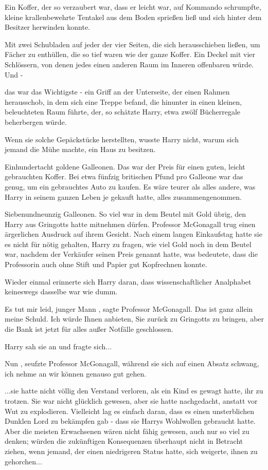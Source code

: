 Ein Koffer, der so verzaubert war, dass er leicht war, auf Kommando schrumpfte,
kleine krallenbewehrte Tentakel aus dem Boden sprießen ließ und sich hinter
dem Besitzer herwinden konnte.

Mit zwei Schubladen auf jeder der vier Seiten, die sich herausschieben ließen,
um Fächer zu enthüllen, die so tief waren wie der ganze Koffer. Ein Deckel
mit vier Schlössern, von denen jedes einen anderen Raum im Inneren
offenbaren würde. Und -

das war das Wichtigste - ein Griff an der Unterseite, der einen Rahmen
herausschob, in dem sich eine Treppe befand, die hinunter in einen kleinen,
beleuchteten Raum führte, der, so schätzte Harry, etwa zwölf Bücherregale
beherbergen würde.

Wenn sie solche Gepäckstücke herstellten, wusste Harry nicht, warum sich jemand
die Mühe machte, ein Haus zu besitzen.

Einhundertacht goldene Galleonen. Das war der Preis für einen guten, leicht
gebrauchten Koffer. Bei etwa fünfzig britischen Pfund pro Galleone war das
genug, um ein gebrauchtes Auto zu kaufen. Es wäre teurer als alles andere,
was Harry in seinem ganzen Leben je gekauft hatte, alles zusammengenommen.

Siebenundneunzig Galleonen. So viel war in dem Beutel mit Gold übrig, den Harry
aus Gringotts hatte mitnehmen dürfen. Professor McGonagall trug einen
ärgerlichen Ausdruck auf ihrem Gesicht. Nach einem langen Einkaufstag hatte
sie es nicht für nötig gehalten, Harry zu fragen, wie viel Gold noch in dem
Beutel war, nachdem der Verkäufer seinen Preis genannt hatte, was bedeutete,
dass die Professorin auch ohne Stift und Papier gut Kopfrechnen konnte.

Wieder einmal erinnerte sich Harry daran, dass wissenschaftlicher Analphabet
keineswegs dasselbe war wie dumm.

\glqq Es tut mir leid, junger Mann\grqq{} , sagte Professor McGonagall. \glqq
Das ist ganz allein meine Schuld. Ich würde Ihnen anbieten, Sie zurück zu
Gringotts zu bringen, aber die Bank ist jetzt für alles außer Notfälle
geschlossen.\grqq{}

Harry sah sie an und fragte sich...

\glqq Nun\grqq{} , seufzte Professor McGonagall, während sie sich auf einen
Absatz schwang, \glqq ich nehme an wir können genauso gut gehen.\grqq{}

...sie hatte nicht völlig den Verstand verloren, als ein Kind es gewagt hatte,
ihr zu trotzen. Sie war nicht glücklich gewesen, aber sie hatte nachgedacht,
anstatt vor Wut zu explodieren. Vielleicht lag es einfach daran, dass es
einen unsterblichen Dunklen Lord zu bekämpfen gab - dass sie Harrys
Wohlwollen gebraucht hatte. Aber die meisten Erwachsenen wären nicht fähig
gewesen, auch nur so viel zu denken; würden die zukünftigen Konsequenzen
überhaupt nicht in Betracht ziehen, wenn jemand, der einen niedrigeren
Status hatte, sich weigerte, ihnen zu gehorchen...

